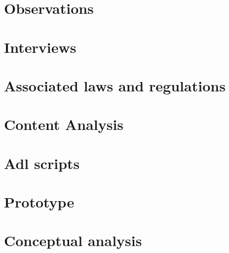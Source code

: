 \newpage
\appendix

\section{Observations} \label{appendixLoglines}




\newpage



\newpage
\section{Interviews}\label{appendixInterviews}


\newpage
\section{Associated laws and regulations}\label{list:ass-laws-regulations}


\newpage
\section{Content Analysis}\label{appendixContentAnalysis}


\newpage
\section{Adl scripts}\label{appendixAdl}


\newpage
\section{Prototype}\label{appendixPrototype}


\newpage
\section{Conceptual analysis}\label{ConceptualAnalysis}




